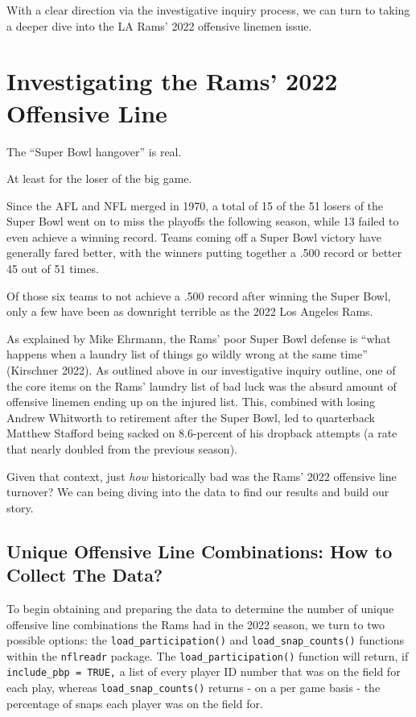 \documentclass[
  letterpaper,
]{krantz}
\begin{document}
With a clear direction via the investigative inquiry process, we can
turn to taking a deeper dive into the LA Rams' 2022 offensive linemen
issue.

\hypertarget{investigating-the-rams-2022-offensive-line}{%
\section{Investigating the Rams' 2022 Offensive
Line}\label{investigating-the-rams-2022-offensive-line}}

The ``Super Bowl hangover'' is real.

At least for the loser of the big game.

Since the AFL and NFL merged in 1970, a total of 15 of the 51 losers of
the Super Bowl went on to miss the playoffs the following season, while
13 failed to even achieve a winning record. Teams coming off a Super
Bowl victory have generally fared better, with the winners putting
together a .500 record or better 45 out of 51 times.

Of those six teams to not achieve a .500 record after winning the Super
Bowl, only a few have been as downright terrible as the 2022 Los Angeles
Rams.

As explained by Mike Ehrmann, the Rams' poor Super Bowl defense is
``what happens when a laundry list of things go wildly wrong at the same
time'' (Kirschner 2022). As outlined above in our investigative inquiry
outline, one of the core items on the Rams' laundry list of bad luck was
the absurd amount of offensive linemen ending up on the injured list.
This, combined with losing Andrew Whitworth to retirement after the
Super Bowl, led to quarterback Matthew Stafford being sacked on
8.6-percent of his dropback attempts (a rate that nearly doubled from
the previous season).

Given that context, just \emph{how} historically bad was the Rams' 2022
offensive line turnover? We can being diving into the data to find our
results and build our story.

\hypertarget{unique-offensive-line-combinations-how-to-collect-the-data}{%
\subsection{Unique Offensive Line Combinations: How to Collect The
Data?}\label{unique-offensive-line-combinations-how-to-collect-the-data}}

To begin obtaining and preparing the data to determine the number of
unique offensive line combinations the Rams had in the 2022 season, we
turn to two possible options: the \texttt{load\_participation()} and
\texttt{load\_snap\_counts()} functions within the \texttt{nflreadr}
package. The \texttt{load\_participation()} function will return, if
\texttt{include\_pbp\ =\ TRUE,} a list of every player ID number that
was on the field for each play, whereas \texttt{load\_snap\_counts()}
returns - on a per game basis - the percentage of snaps each player was
on the field for.
\end{document}
